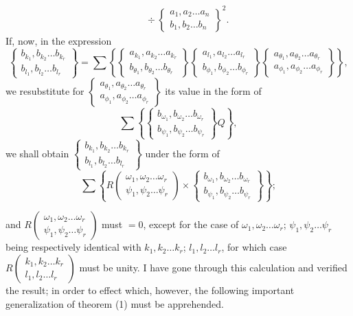\documentclass[11pt]{article}
\newcommand{\sourcepage}[1]{\marginpar{\scriptsize p.~#1}}
\newcommand{\bd}[2]{\left\{\begin{matrix}#1\\#2\end{matrix}\right\}}
\begin{document}
{{\[\begin{aligned}
&\quad\div \bd{a_1,a_2\ldots a_n}{b_1,b_2\ldots b_n}^2.
\end{aligned}
\]
If, now, in the expression
\[
\bd{b_{k_1},b_{k_2}\ldots b_{k_r}}{b_{l_1},b_{l_2}\ldots b_{l_r}}
=
\sum\left\{\bd{a_{k_1},a_{k_2}\ldots a_{k_r}}{b_{\theta_1},b_{\theta_2}\ldots b_{\theta_r}}
\bd{a_{l_1},a_{l_2}\ldots a_{l_r}}{b_{\phi_1},b_{\phi_2}\ldots b_{\phi_r}}
\bd{a_{\theta_1},a_{\theta_2}\ldots a_{\theta_r}}{a_{\phi_1},a_{\phi_2}\ldots a_{\phi_r}}
\right\},
\]
we resubstitute for $\bd{a_{\theta_1},a_{\theta_2}\ldots a_{\theta_r}}{a_{\phi_1},a_{\phi_2}\ldots a_{\phi_r}}$ its value in the form of
\[
\sum\left\{\bd{b_{\omega_1},b_{\omega_2}\ldots b_{\omega_r}}{b_{\psi_1},b_{\psi_2}\ldots b_{\psi_r}}Q\right\},
\]
we shall obtain $\bd{b_{k_1},b_{k_2}\ldots b_{k_r}}{b_{l_1},b_{l_2}\ldots b_{l_r}}$ under the form of
\[
\sum\left\{R\left(\begin{matrix}\omega_1,\omega_2\ldots\omega_r\\ \psi_1,\psi_2\ldots\psi_r\end{matrix}\right)
\times \bd{b_{\omega_1},b_{\omega_2}\ldots b_{\omega_r}}{b_{\psi_1},b_{\psi_2}\ldots b_{\psi_r}}\right\};
\]

\sourcepage{249}
and $R\left(\begin{smallmatrix}\omega_1,\omega_2\ldots\omega_r\\ \psi_1,\psi_2\ldots\psi_r\end{smallmatrix}\right)$ must $=0$, except for the case of $\omega_1,\omega_2\ldots\omega_r$; $\psi_1,\psi_2\ldots\psi_r$ being respectively identical with $k_1,k_2\ldots k_r$; $l_1,l_2\ldots l_r$, for which case
$R\left(\begin{smallmatrix}k_1,k_2\ldots k_r\\ l_1,l_2\ldots l_r\end{smallmatrix}\right)$ must be unity. I have gone through this calculation and verified the result; in order to effect which, however, the following important generalization of theorem (1) must be apprehended.

}}
\end{document}
